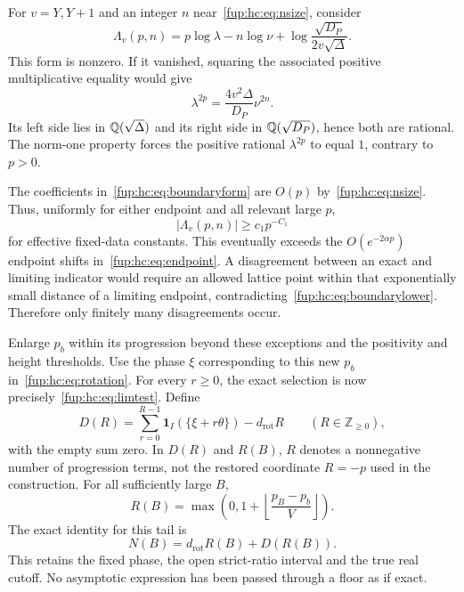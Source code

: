 \documentclass[11pt,letterpaper]{article}
\theoremstyle{definition}\newtheorem{definition}[theorem]{Definition}
\theoremstyle{remark}\newtheorem{remark}[theorem]{Remark}
\newcommand{\Z}{\mathbb Z}\newcommand{\Np}{\mathbb Z_{>0}}
\newcommand{\drot}{d_{\mathrm{rot}}}
\begin{document}
For $v=Y,Y+1$ and an integer $n$ near~\eqref{fup:hc:eq:nsize}, consider
\begin{equation}\label{fup:hc:eq:boundaryform}
 \Lambda_v(p,n)=p\log\lambda-n\log\nu+
           \log\frac{\sqrt{D_P}}{2v\sqrt\Delta}.
\end{equation}
This form is nonzero. If it vanished, squaring the associated positive multiplicative equality would give
\[
 \lambda^{2p}=\frac{4v^2\Delta}{D_P}\nu^{2n}.
\]
Its left side lies in $\mathbb Q(\sqrt\Delta)$ and its right side in $\mathbb Q(\sqrt{D_P})$, hence both are rational. The norm-one property forces the positive rational $\lambda^{2p}$ to equal $1$, contrary to $p>0$.

The coefficients in~\eqref{fup:hc:eq:boundaryform} are $O(p)$ by~\eqref{fup:hc:eq:nsize}. Thus, uniformly for either endpoint and all relevant large $p$,
\begin{equation}\label{fup:hc:eq:boundarylower}
 |\Lambda_v(p,n)|\ge c_1p^{-C_1}
\end{equation}
for effective fixed-data constants. This eventually exceeds the $O(e^{-2\alpha p})$ endpoint shifts in~\eqref{fup:hc:eq:endpoint}. A disagreement between an exact and limiting indicator would require an allowed lattice point within that exponentially small distance of a limiting endpoint, contradicting~\eqref{fup:hc:eq:boundarylower}. Therefore only finitely many disagreements occur.

Enlarge $p_b$ within its progression beyond these exceptions and the positivity and height thresholds. Use the phase $\xi$ corresponding to this new $p_b$ in~\eqref{fup:hc:eq:rotation}. For every $r\ge0$, the exact selection is now precisely~\eqref{fup:hc:eq:limtest}. Define
\begin{equation}\label{fup:hc:eq:discrepancy}
 D(R)=\sum_{r=0}^{R-1}\mathbf 1_I(\{\xi+r\theta\})-\drot R
       \qquad(R\in\Z_{\ge0}),
\end{equation}
with the empty sum zero. In $D(R)$ and $R(B)$, $R$ denotes a nonnegative number of progression terms, not the restored coordinate $R=-p$ used in the construction. For all sufficiently large $B$,
\begin{equation}\label{fup:hc:eq:Rcut}
 R(B)=\max\left(0,1+\left\lfloor\frac{p_B-p_b}{V}\right\rfloor\right).
\end{equation}
The exact identity for this tail is
\begin{equation}\label{fup:hc:eq:exactcount}
 N(B)=\drot R(B)+D(R(B)).
\end{equation}
This retains the fixed phase, the open strict-ratio interval and the true real cutoff. No asymptotic expression has been passed through a floor as if exact.
\end{document}
